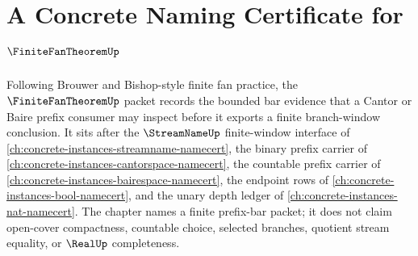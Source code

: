 \chapter{A Concrete Naming Certificate for $\FiniteFanTheoremUp$}
\label{ch:concrete-instances-finite-fan-theorem-namecert}

Following Brouwer and Bishop-style finite fan practice, the $\FiniteFanTheoremUp$ packet records the bounded bar evidence that a Cantor or Baire prefix consumer may inspect before it exports a finite branch-window conclusion. It sits after the $\StreamNameUp$ finite-window interface of \autoref{ch:concrete-instances-streamname-namecert}, the binary prefix carrier of \autoref{ch:concrete-instances-cantorspace-namecert}, the countable prefix carrier of \autoref{ch:concrete-instances-bairespace-namecert}, the endpoint rows of \autoref{ch:concrete-instances-bool-namecert}, and the unary depth ledger of \autoref{ch:concrete-instances-nat-namecert}. The chapter names a finite prefix-bar packet; it does not claim open-cover compactness, countable choice, selected branches, quotient stream equality, or $\RealUp$ completeness.

